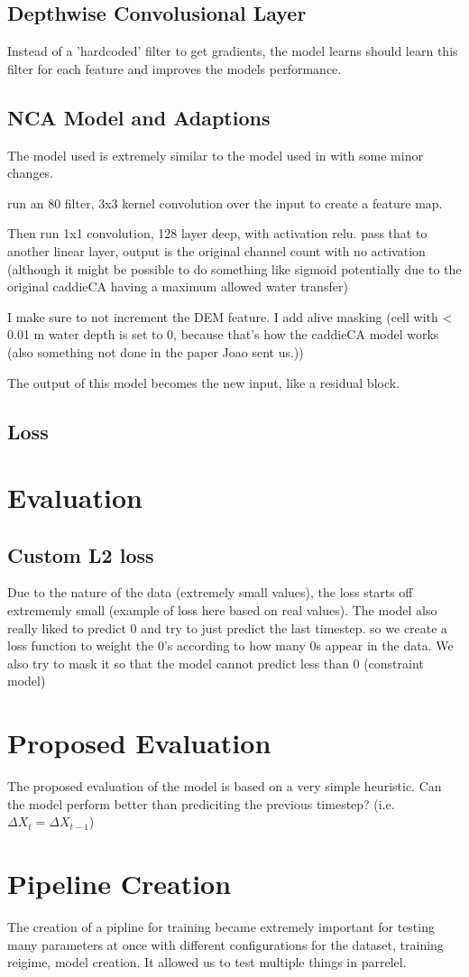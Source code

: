 \subsection{Depthwise Convolusional Layer}
Instead of a 'hardcoded' filter to get gradients, the model learns should learn this filter for each feature and improves the models performance.


\subsection{NCA Model and Adaptions}
The model used is extremely similar to the model used in \cite{growing_nca} with some minor changes.

run an 80 filter, 3x3 kernel convolution over the input to create a feature map.

Then run 1x1 convolution, 128 layer deep, with activation relu.
pass that to another linear layer, output is the original channel count with no activation (although it might be possible to do something like sigmoid potentially due to the original caddieCA having a maximum allowed water transfer)

I make sure to not increment the DEM feature. I add alive masking (cell with \textless{} {0.01} m water depth is set to 0, because that's how the caddieCA model works (also something not done in the paper Joao sent us.))

The output of this model  becomes the new input, like a residual block.

\subsection{Loss}

\section{Evaluation}
\subsection{Custom L2 loss}
Due to the nature of the data (extremely small values), the loss starts off extrememly small (example of loss here based on real values). The model also really liked to predict 0 and try to just predict the last timestep. so we create a loss function to weight the 0's according to how many 0s appear in the data. We also try to mask it so that the model cannot predict less than 0 (constraint model)
\section{Proposed Evaluation}
The proposed evaluation of the model is based on a very simple heuristic. Can the model perform better than prediciting the previous timestep? (i.e. $\Delta{X_{t}} = \Delta{X_{t-1}}$)
\section{Pipeline Creation}
The creation of a pipline for training became extremely important for testing many parameters at once with different configurations for the dataset, training reigime, model creation. It allowed us to test multiple things in parrelel.
